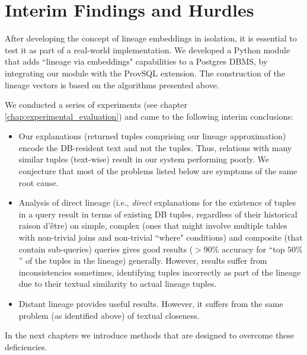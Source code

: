\section{Interim Findings and Hurdles}
After developing the concept of lineage embeddings in isolation, it is essential to test it as part of a real-world implementation. We developed a Python module that adds ``lineage via embeddings" capabilities to a Postgres DBMS, by integrating our module with the ProvSQL \cite{Senellart2018} extension. The construction of the lineage vectors is based on the algorithms presented above.
\par We conducted a series of experiments (see chapter \ref{chap:experimental_evaluation}) and came to the following interim conclusions:
\begin{itemize}
    \item Our explanations (returned tuples comprising our lineage approximation) encode the DB-resident text and not the tuples. Thus, relations with many similar tuples (text-wise) result in our system performing poorly. We conjecture that most of the problems listed below are symptoms of the same root cause.
    \item Analysis of direct lineage (i.e., \textit{direct} explanations for the existence of tuples in a query result in terms of existing DB tuples, regardless of their historical raison d'être) on simple, complex (ones that might involve multiple tables with non-trivial joins and non-trivial ``where" conditions) and composite (that contain sub-queries) queries gives good results ($> 90\%$ accuracy for ``top $50\%$'' of the tuples in the lineage) generally. However, results suffer from inconsistencies sometimes, identifying tuples incorrectly as part of the lineage due to their textual similarity to actual lineage tuples.
    \item Distant lineage provides useful results. However, it suffers from the same problem (as identified above) of textual closeness.
\end{itemize}

\par In the next chapters we introduce methods that are designed to overcome these deficiencies.
